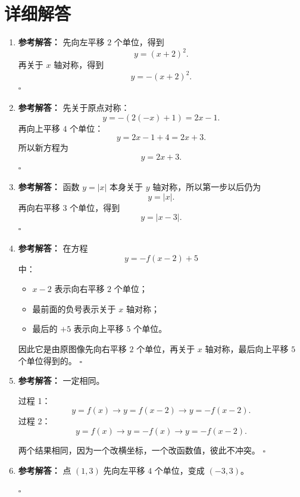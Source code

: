 \documentclass[11pt,a4paper,fontset=fandol]{ctexart}
\newenvironment{solution}{\par\noindent\textbf{参考解答：}}{\hfill$\square$\par}
\begin{document}
\newpage
\section{详细解答}

\begin{enumerate}
  \item \begin{solution}
  先向左平移 $2$ 个单位，得到
  \[
  y=(x+2)^2.
  \]
  再关于 \(x\) 轴对称，得到
  \[
  \boxed{y=-(x+2)^2}.
  \]
  \end{solution}

  \item \begin{solution}
  先关于原点对称：
  \[
  y=-(2(-x)+1)=2x-1.
  \]
  再向上平移 $4$ 个单位：
  \[
  y=2x-1+4=2x+3.
  \]
  所以新方程为
  \[
  \boxed{y=2x+3}.
  \]
  \end{solution}

  \item \begin{solution}
  函数 \(y=|x|\) 本身关于 \(y\) 轴对称，所以第一步以后仍为
  \[
  y=|x|.
  \]
  再向右平移 $3$ 个单位，得到
  \[
  \boxed{y=|x-3|}.
  \]
  \end{solution}

  \item \begin{solution}
  在方程
  \[
  y=-f(x-2)+5
  \]
  中：
  \begin{itemize}
    \item \(x-2\) 表示向右平移 $2$ 个单位；
    \item 最前面的负号表示关于 \(x\) 轴对称；
    \item 最后的 \(+5\) 表示向上平移 $5$ 个单位。
  \end{itemize}
  因此它是由原图像先向右平移 $2$ 个单位，再关于 \(x\) 轴对称，最后向上平移 $5$ 个单位得到的。
  \end{solution}

  \item \begin{solution}
  一定相同。

  过程 1：
  \[
  y=f(x) \rightarrow y=f(x-2) \rightarrow y=-f(x-2).
  \]
  过程 2：
  \[
  y=f(x) \rightarrow y=-f(x) \rightarrow y=-f(x-2).
  \]

  两个结果相同，因为一个改横坐标，一个改函数值，彼此不冲突。
  \end{solution}

  \item \begin{solution}
  点 \((1,3)\) 先向左平移 $4$ 个单位，变成 \((-3,3)\)。


\end{solution}
\end{enumerate}
\end{document}
